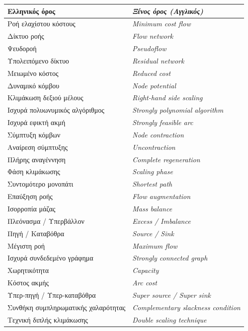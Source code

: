 \documentclass[11pt,a4paper,oneside]{report}
\begin{document}
\begin{center}
\small
\renewcommand{\arraystretch}{1.2}
\begin{tabularx}{\linewidth}{@{}>{\raggedright\arraybackslash}X >{\raggedright\arraybackslash\itshape}X@{}}
\toprule
\textbf{Ελληνικός όρος} & \textbf{\textup{Ξένος όρος (Αγγλικός)}} \\
\midrule
Ροή ελαχίστου κόστους & \textenglish{Minimum cost flow} \\
Δίκτυο ροής & \textenglish{Flow network} \\
Ψευδοροή & \textenglish{Pseudoflow} \\
Υπολειπόμενο δίκτυο & \textenglish{Residual network} \\
Μειωμένο κόστος & \textenglish{Reduced cost} \\
Δυναμικό κόμβου & \textenglish{Node potential} \\
Κλιμάκωση δεξιού μέλους & \textenglish{Right-hand side scaling} \\
Ισχυρά πολυωνυμικός αλγόριθμος & \textenglish{Strongly polynomial algorithm} \\
Ισχυρά εφικτή ακμή & \textenglish{Strongly feasible arc} \\
Σύμπτυξη κόμβων & \textenglish{Node contraction} \\
Αναίρεση σύμπτυξης & \textenglish{Uncontraction} \\
Πλήρης αναγέννηση & \textenglish{Complete regeneration} \\
Φάση κλιμάκωσης & \textenglish{Scaling phase} \\
Συντομότερο μονοπάτι & \textenglish{Shortest path} \\
Επαύξηση ροής & \textenglish{Flow augmentation} \\
Ισορροπία μάζας & \textenglish{Mass balance} \\
Πλεόνασμα / Υπερβάλλον & \textenglish{Excess / Imbalance} \\
Πηγή / Καταβόθρα & \textenglish{Source / Sink} \\
Μέγιστη ροή & \textenglish{Maximum flow} \\
Ισχυρά συνδεδεμένο γράφημα & \textenglish{Strongly connected graph} \\
Χωρητικότητα & \textenglish{Capacity} \\
Κόστος ακμής & \textenglish{Arc cost} \\
Υπερ-πηγή / Υπερ-καταβόθρα & \textenglish{Super source / Super sink} \\
Συνθήκη συμπληρωματικής χαλαρότητας & \textenglish{Complementary slackness condition} \\
Τεχνική διπλής κλιμάκωσης & \textenglish{Double scaling technique} \\
\bottomrule
\end{tabularx}
\end{center}
\end{document}
